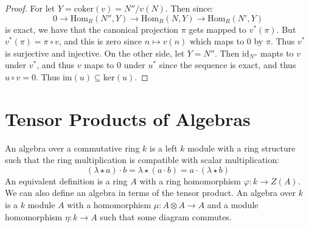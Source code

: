 \documentclass{article}                                                        %
\begin{document}
        \begin{proof}
            For let $Y=\textrm{coker}(v)=N''/v(N)$. Then since:
            \begin{equation}
                0\rightarrow\textrm{Hom}_{R}(N'',Y)
                \rightarrow\textrm{Hom}_{R}(N,Y)
                \rightarrow\textrm{Hom}_{R}(N',Y)
            \end{equation}
            is exact, we have that the canonical projection $\pi$ gets mapped
            to $v^{*}(\pi)$. But $v^{*}(\pi)=\pi\circ{v}$, and this is zero
            since $n\mapsto{v}(n)$ which maps to $0$ by $\pi$. Thus $v^{*}$ is
            surjective and injective. On the other side, let $Y=N''$. Then
            $\textrm{id}_{N''}$ mapts to $v$ under $v^{*}$, and thus
            $v$ maps to $0$ under $u^{*}$ since the sequence is exact, and
            thus $u\circ{v}=0$. Thus $\textrm{im}(u)\subseteq\textrm{ker}(u)$.
        \end{proof}
    \section{Tensor Products of Algebras}
        An algebra over a commutative ring $k$ is a left $k$ module with a ring
        structure such that the ring multiplication is compatible with scalar
        multiplication:
        \begin{equation}
            (\lambda\star{a})\cdot{b}=\lambda\star(a\cdot{b})
                =a\cdot(\lambda\star{b})
        \end{equation}
        An equivalent definition is a ring $A$ with a ring homomorphism
        $\varphi:k\rightarrow{Z}(A)$. We can also define an algebra in terms of
        the tensor product. An algebra over $k$ is a $k$ module $A$ with a
        homomorphism $\mu:A\otimes{A}\rightarrow{A}$ and a module homomorphism
        $\eta:k\rightarrow{A}$ such that some diagram commutes.
\end{document}
